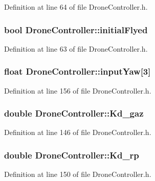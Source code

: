 Definition at line 64 of file Drone\-Controller.\-h.

\subsubsection[{initial\-Flyed}]{\setlength{\rightskip}{0pt plus 5cm}bool Drone\-Controller\-::initial\-Flyed\hspace{0.3cm}{\ttfamily [private]}}\label{classDroneController_a67f91259be86d723e5b7627097e8b3cc}


Definition at line 63 of file Drone\-Controller.\-h.

\subsubsection[{input\-Yaw}]{\setlength{\rightskip}{0pt plus 5cm}float Drone\-Controller\-::input\-Yaw[3]}\label{classDroneController_ae32af48b304ec41cedc8ff2c3cf32c68}


Definition at line 156 of file Drone\-Controller.\-h.

\subsubsection[{Kd\-\_\-gaz}]{\setlength{\rightskip}{0pt plus 5cm}double Drone\-Controller\-::\-Kd\-\_\-gaz}\label{classDroneController_a65e8aa59edf1c5814c249af9bc544f00}


Definition at line 146 of file Drone\-Controller.\-h.

\subsubsection[{Kd\-\_\-rp}]{\setlength{\rightskip}{0pt plus 5cm}double Drone\-Controller\-::\-Kd\-\_\-rp}\label{classDroneController_abd40362b2025067b1cb5a0c3a3faa037}


Definition at line 150 of file Drone\-Controller.\-h.

